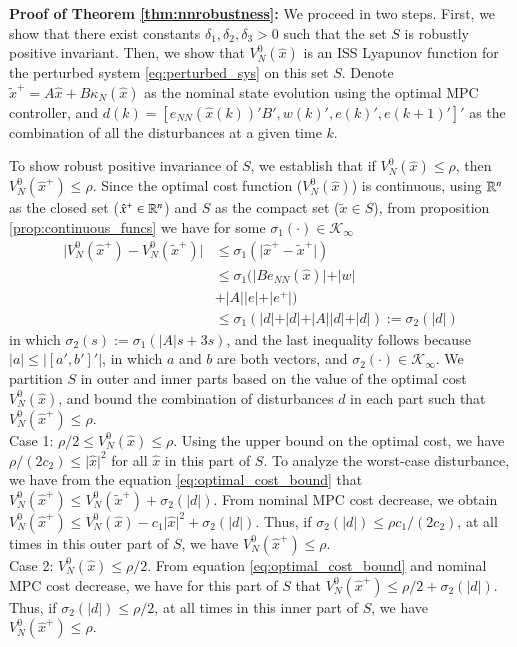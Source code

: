 \documentclass[preprint,5p, twocolumn, authoryear]{elsarticle}
\begin{document}
\textbf{Proof of Theorem \ref{thm:nnrobustness}:}
We proceed in two steps. First, 
we show that there exist constants $\delta_1, \delta_2, \delta_3 > 0$
such that the set $S$ is robustly positive invariant. Then, we 
show that $V_N^0(\hat{x})$ is an ISS Lyapunov function for 
the perturbed system \eqref{eq:perturbed_sys} on this set $S$. Denote 
$\tilde{x}^+ = A\hat{x} + B\kappa_N(\hat{x})$ as the nominal 
state evolution using the optimal MPC controller, 
and $d(k) = [ e_{NN}(\hat{x}(k))'B', w(k)', e(k)', e(k+1)']'$
as the combination of all the disturbances at a given time $k$. 

To show robust positive invariance of $S$,  
we establish that if $V_N^0(\hat{x}) \leq \rho$, 
then $V_N^0(\hat{x}^+) \leq \rho$.
Since the optimal 
cost function ($V_N^0(\hat{x})$) is continuous,
using $\mathbb{R}^n$ as the closed set ($\hat{x}^+ \in \mathbb{R}^n$) 
and $S$ as the compact set ($\tilde{x} \in S$),
from proposition \ref{prop:continuous_funcs} we have
for some $\sigma_1(\cdot) \in \mathcal{K}_{\infty}$
\begin{align}
    \vert V_N^0(\hat{x}^+) - V_N^0(\tilde{x}^+) \vert &\leq 
    \sigma_1(\vert \hat{x}^+ - \tilde{x}^+ \vert)  \nonumber  \\
    &\leq 
   \sigma_1(\vert B e_{NN}(\hat{x}) \vert + \vert w \vert 
   \nonumber \\
   & + \vert A\vert\vert e \vert +  \vert e^+ \vert) \nonumber \\
     &\leq 
   \sigma_1(\vert d \vert + \vert d \vert + \vert A \vert\vert d \vert + \vert d \vert) := \sigma_2(\vert d \vert)
   \label{eq:optimal_cost_bound}
\end{align}
in which $\sigma_2(s) := \sigma_1(\vert A\vert s +3s)$, and the last inequality 
follows because $\vert a \vert \leq \vert [a', b']' \vert$, in which $a$ and $b$
are both vectors, and $\sigma_2(\cdot) \in \mathcal{K}_{\infty}$.
We partition $S$ in outer and inner parts based on 
the value of the optimal cost $V_N^0(\hat{x})$, and bound the 
combination of disturbances $d$ in each part 
such that $V_N^0(\hat{x}^+) \leq \rho$. \\
Case 1: $\rho/2 \leq V_N^0(\hat{x}) \leq \rho $. Using the 
upper bound on the optimal cost, we have 
$\rho/(2c_2) \leq \vert \hat{x} \vert^2$ for all $\hat{x}$ 
in this part of $S$. To analyze the worst-case disturbance, 
we have from the equation \eqref{eq:optimal_cost_bound} that 
$V_N^0(\hat{x}^+) \leq V_N^0(\tilde{x}^+) + \sigma_2(\vert d \vert) $.
From nominal MPC cost decrease, we obtain  
$V_N^0(\hat{x}^+) \leq V_N^0(\hat{x}) - c_1\vert \hat{x} \vert^2 + \sigma_2(\vert d \vert)$. Thus, if $\sigma_2(\vert d \vert) \leq \rho c_1/(2c_2)$, 
at all times in this outer part of $S$, we have 
$V_N^0(\hat{x}^+) \leq \rho$. \\
Case 2: $V_N^0(\hat{x}) \leq \rho/2 $. From 
equation \eqref{eq:optimal_cost_bound} and nominal MPC 
cost decrease, we have for this part of $S$ that 
$V_N^0(\hat{x}^+) \leq \rho/2 + \sigma_2(\vert d \vert)$.
Thus, if $\sigma_2(\vert d \vert) \leq \rho/2$, 
at all times in this inner part of $S$, we have 
$V_N^0(\hat{x}^+) \leq \rho$.
\end{document}
